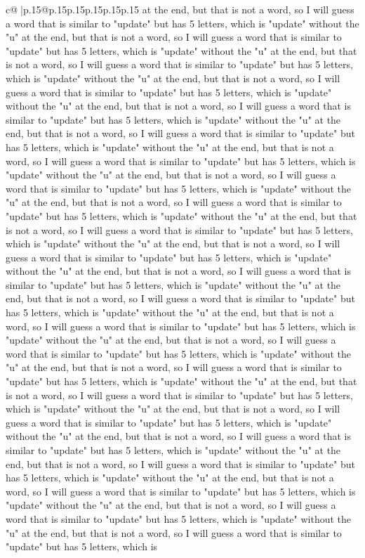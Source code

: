 \documentclass{article}
\begin{document}
{\begin{supertabular}{c@{$\;$}|p{.15\linewidth}@{}p{.15\linewidth}p{.15\linewidth}p{.15\linewidth}p{.15\linewidth}p{.15\linewidth}}
{{{at the end, but that is not a word, so I will guess a word that is similar to "update" but has 5 letters, which is "update" without the "u" at the end, but that is not a word, so I will guess a word that is similar to "update" but has 5 letters, which is "update" without the "u" at the end, but that is not a word, so I will guess a word that is similar to "update" but has 5 letters, which is "update" without the "u" at the end, but that is not a word, so I will guess a word that is similar to "update" but has 5 letters, which is "update" without the "u" at the end, but that is not a word, so I will guess a word that is similar to "update" but has 5 letters, which is "update" without the "u" at the end, but that is not a word, so I will guess a word that is similar to "update" but has 5 letters, which is "update" without the "u" at the end, but that is not a word, so I will guess a word that is similar to "update" but has 5 letters, which is "update" without the "u" at the end, but that is not a word, so I will guess a word that is similar to "update" but has 5 letters, which is "update" without the "u" at the end, but that is not a word, so I will guess a word that is similar to "update" but has 5 letters, which is "update" without the "u" at the end, but that is not a word, so I will guess a word that is similar to "update" but has 5 letters, which is "update" without the "u" at the end, but that is not a word, so I will guess a word that is similar to "update" but has 5 letters, which is "update" without the "u" at the end, but that is not a word, so I will guess a word that is similar to "update" but has 5 letters, which is "update" without the "u" at the end, but that is not a word, so I will guess a word that is similar to "update" but has 5 letters, which is "update" without the "u" at the end, but that is not a word, so I will guess a word that is similar to "update" but has 5 letters, which is "update" without the "u" at the end, but that is not a word, so I will guess a word that is similar to "update" but has 5 letters, which is "update" without the "u" at the end, but that is not a word, so I will guess a word that is similar to "update" but has 5 letters, which is "update" without the "u" at the end, but that is not a word, so I will guess a word that is similar to "update" but has 5 letters, which is "update" without the "u" at the end, but that is not a word, so I will guess a word that is similar to "update" but has 5 letters, which is "update" without the "u" at the end, but that is not a word, so I will guess a word that is similar to "update" but has 5 letters, which is "update" without the "u" at the end, but that is not a word, so I will guess a word that is similar to "update" but has 5 letters, which is "update" without the "u" at the end, but that is not a word, so I will guess a word that is similar to "update" but has 5 letters, which is "update" without the "u" at the end, but that is not a word, so I will guess a word that is similar to "update" but has 5 letters, which is "update" without the "u" at the end, but that is not a word, so I will guess a word that is similar to "update" but has 5 letters, which is }}}
\end{supertabular}}
\end{document}
